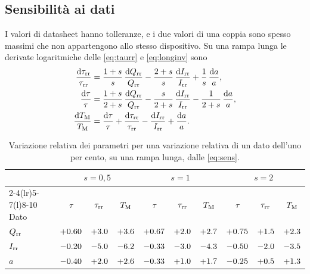 \documentclass[10pt,a4paper]{scrartcl}
\let\newcommand\pdvaluedefine
\newcommand{\Irr}{I_\mathrm{rr}}
\newcommand{\Qrr}{Q_\mathrm{rr}}
\newcommand{\taurr}{\tau_\mathrm{rr}}
\newcommand{\TM}{T_\mathrm{M}}
\newcommand{\diff}{\mathrm{d}}
\begin{document}
\subsection{Sensibilità ai dati}
\label{sec:sens}
I valori di datasheet hanno tolleranze, e i due valori di una coppia sono spesso massimi che non appartengono allo stesso dispositivo. Su una rampa lunga le derivate logaritmiche delle \eqref{eq:taurr} e \eqref{eq:longinv} sono
\begin{equation}
\begin{aligned}
\frac{\diff\taurr}{\taurr} &= \frac{1+s}{s}\,\frac{\diff\Qrr}{\Qrr} - \frac{2+s}{s}\,\frac{\diff\Irr}{\Irr} + \frac{1}{s}\,\frac{\diff a}{a} , \\
\frac{\diff\tau}{\tau} &= \frac{1+s}{2+s}\,\frac{\diff\Qrr}{\Qrr} - \frac{s}{2+s}\,\frac{\diff\Irr}{\Irr} - \frac{1}{2+s}\,\frac{\diff a}{a} , \\
\frac{\diff\TM}{\TM} &= \frac{\diff\tau}{\tau} + \frac{\diff\taurr}{\taurr} - \frac{\diff\Irr}{\Irr} + \frac{\diff a}{a} .
\end{aligned}
\label{eq:sens}
\end{equation}

\begin{table}[htb]
\centering\small
\caption{Variazione relativa dei parametri per una variazione relativa di un dato dell'uno per cento, su una rampa lunga, dalle \eqref{eq:sens}.}
\label{tab:sens}
\begin{tabular}{@{}lccccccccc@{}}
\toprule
 & \multicolumn{3}{c}{$s = 0,5$} & \multicolumn{3}{c}{$s = 1$} & \multicolumn{3}{c}{$s = 2$} \\
\cmidrule(lr){2-4}\cmidrule(lr){5-7}\cmidrule(l){8-10}
Dato & $\tau$ & $\taurr$ & $\TM$ & $\tau$ & $\taurr$ & $\TM$ & $\tau$ & $\taurr$ & $\TM$ \\
\midrule
$\Qrr$ & $+0.60$ & $+3.0$ & $+3.6$ & $+0.67$ & $+2.0$ & $+2.7$ & $+0.75$ & $+1.5$ & $+2.3$ \\
$\Irr$ & $-0.20$ & $-5.0$ & $-6.2$ & $-0.33$ & $-3.0$ & $-4.3$ & $-0.50$ & $-2.0$ & $-3.5$ \\
$a$ & $-0.40$ & $+2.0$ & $+2.6$ & $-0.33$ & $+1.0$ & $+1.7$ & $-0.25$ & $+0.5$ & $+1.3$ \\
\bottomrule
\end{tabular}
\end{table}
\end{document}

